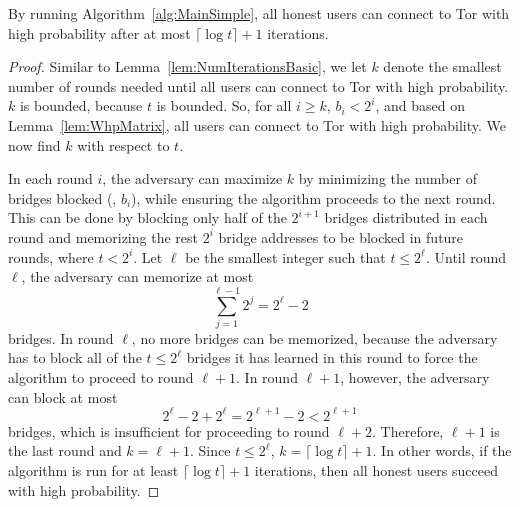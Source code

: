 \begin{lemma} \label{lem:NumIterationsMatrix}
	By running Algorithm~\ref{alg:MainSimple}, all honest users can connect to Tor with high probability after at most ${\lceil \log{t} \rceil + 1}$ iterations.
\end{lemma}
\begin{proof}
	Similar to Lemma~\ref{lem:NumIterationsBasic}, we let $k$ denote the smallest number of rounds needed until all users can connect to Tor with high probability. $k$ is bounded, because $t$ is bounded. So, for all ${i \geq k}$, ${b_i < 2^i}$, and based on Lemma~\ref{lem:WhpMatrix}, all users can connect to Tor with high probability. We now find $k$ with respect to $t$. 
	
	In each round $i$, the adversary can maximize $k$ by minimizing the number of bridges blocked (\ie, $b_i$), while ensuring the algorithm proceeds to the next round. This can be done by blocking only half of the $2^{i+1}$ bridges distributed in each round and memorizing the rest $2^{i}$ bridge addresses to be blocked in future rounds, where ${t < 2^i}$. Let $\ell$ be the smallest integer such that ${t \leq 2^\ell}$.
	Until round $\ell$, the adversary can memorize at most 
	\[\sum_{j=1}^{\ell-1} 2^j = 2^{\ell} - 2\] 
	bridges. In round $\ell$, no more bridges can be memorized, because the adversary has to block all of the ${t \leq 2^\ell}$ bridges it has learned in this round to force the algorithm to proceed to round ${\ell + 1}$.  In round ${\ell + 1}$, however, the adversary can block at most 
	\[2^\ell - 2 + 2^\ell = 2^{\ell+1} - 2 < 2^{\ell+1}\] 
	bridges, which is insufficient for proceeding to round ${\ell + 2}$. Therefore, ${\ell + 1}$ is the last round and ${k = \ell + 1}$. Since ${t \leq 2^\ell}$, ${k = \lceil \log{t} \rceil + 1}$. In other words, if the algorithm is run for at least ${\lceil \log{t} \rceil + 1}$ iterations, then all honest users succeed with high probability.	

\end{proof}
